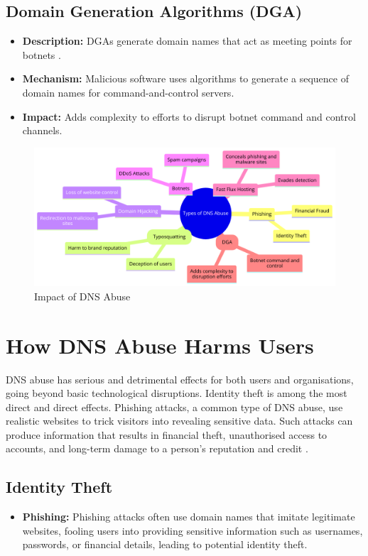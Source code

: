 \subsection{Domain Generation Algorithms (DGA)}
\begin{itemize}
    \item \textbf{Description:} DGAs generate domain names that act as meeting points for botnets \cite{antonakakis2012throw}.
    \item \textbf{Mechanism:} Malicious software uses algorithms to generate a sequence of domain names for command-and-control servers.
    \item \textbf{Impact:} Adds complexity to efforts to disrupt botnet command and control channels.
\end{itemize}
\captionsetup{font= footnotesize}
\begin{figure}[H]
\centering
\includegraphics[width=1.0\textwidth]{background/DNSabuseForms.png}
\caption{Impact of DNS Abuse}
\label{fig:figureThree}
\end{figure}



\section{How DNS Abuse Harms Users}

DNS abuse has serious and detrimental effects for both users and organisations, going beyond basic technological disruptions. Identity theft is among the most direct and direct effects. Phishing attacks, a common type of DNS abuse, use realistic websites to trick visitors into revealing sensitive data. Such attacks can produce information that results in financial theft, unauthorised access to accounts, and long-term damage to a person's reputation and credit \cite{godaddy2023dnsabuse}.

\subsection{Identity Theft}
\begin{itemize}
    \item \textbf{Phishing:} Phishing attacks often use domain names that imitate legitimate websites, fooling users into providing sensitive information such as usernames, passwords, or financial details, leading to potential identity theft.
\end{itemize}

